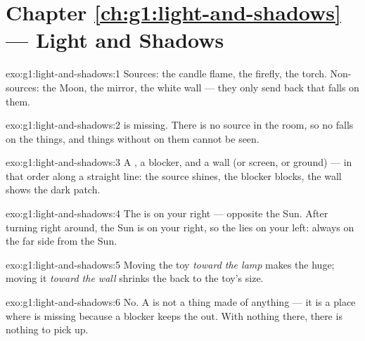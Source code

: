 \section*{Chapter \ref{ch:g1:light-and-shadows} --- Light and Shadows}

\begin{solution}{exo:g1:light-and-shadows:1}
Sources: the candle flame, the firefly, the torch. Non-sources: the
Moon, the mirror, the white wall --- they only send back  that
falls on them.
\end{solution}

\begin{solution}{exo:g1:light-and-shadows:2}
 is missing. There is no source in the room, so no  falls
on the things, and things without  on them cannot be seen.
\end{solution}

\begin{solution}{exo:g1:light-and-shadows:3}
A , a blocker, and a wall (or screen, or ground) --- in
that order along a straight line: the source shines, the blocker
blocks, the wall shows the dark patch.
\end{solution}

\begin{solution}{exo:g1:light-and-shadows:4}
The  is on your right --- opposite the Sun. After turning right
around, the Sun is on your right, so the  lies on your left:
always on the far side from the Sun.
\end{solution}

\begin{solution}{exo:g1:light-and-shadows:5}
Moving the toy \emph{toward the lamp} makes the  huge; moving
it \emph{toward the wall} shrinks the  back to the toy's size.
\end{solution}

\begin{solution}{exo:g1:light-and-shadows:6}
No. A  is not a thing made of anything --- it is a place where
 is missing because a blocker keeps the  out. With nothing
there, there is nothing to pick up.
\end{solution}

